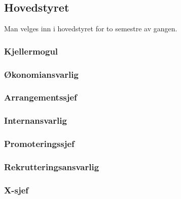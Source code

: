 \documentclass[10pt,norsk,a4paper,usenames,dvipsnames]{article}
\begin{document}
\begin{minipage}[t]{0.5\textwidth}
    \subsection{Hovedstyret}
        Man velges inn i hovedstyret for to semestre av gangen.





        \subsubsection{Kjellermogul}


        \subsubsection{Økonomiansvarlig}


        \subsubsection{Arrangementssjef}


        \subsubsection{Internansvarlig}


        \subsubsection{Promoteringssjef}


        \subsubsection{Rekrutteringsansvarlig}


        \subsubsection{X-sjef}


\end{minipage}
\end{document}
